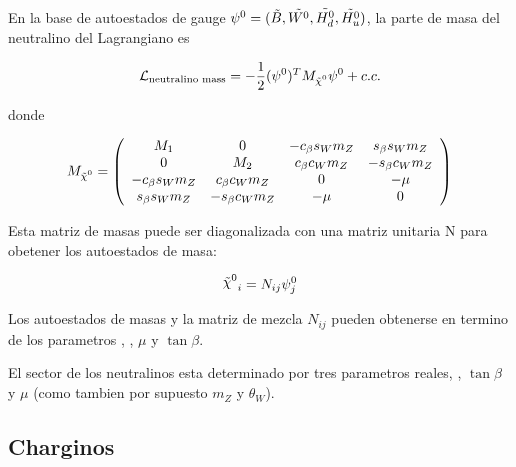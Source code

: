 En la base de autoestados de gauge $\psi^0 = (\tilde{B}, \tilde{W^0}, \tilde{H_d^0}, \tilde{H_u^0})$,
la parte de masa del neutralino del Lagrangiano es

\begin{equation}
  \mathcal{L}_\text{neutralino mass} = -\frac{1}{2} (\psi^0)^T M_{\nino} \psi^0 + c.c.
\end{equation}

donde

\begin{equation}
  M_{\nino} = \left(
  \begin{array}{cccc}
    \M{1} & 0 & -c_\beta s_W m_Z &  s_\beta s_W m_Z \\
    0 & \M{2} & c_\beta c_W m_Z & -s_\beta c_W m_Z \\

    -c_\beta s_W m_Z & c_\beta c_W m_Z & 0 & -\mu \\
    s_\beta s_W m_Z & -s_\beta c_W m_Z & -\mu & 0 \\
  \end{array}
  \right)
\end{equation}

Esta matriz de masas puede ser diagonalizada con una matriz unitaria N para obetener los autoestados
de masa:

\begin{equation}
  \nino_i = N_{ij} \psi^0_j
\end{equation}




Los autoestados de masas y la matriz de mezcla $N_{ij}$ pueden obtenerse en termino de los parametros
, , $\mu$ y $\tan\beta$.

El sector de los neutralinos esta determinado por tres parametros reales, , $\tan\beta$ y
$\mu$ (como tambien por supuesto $m_Z$ y $\theta_W$).


\subsection{Charginos}

